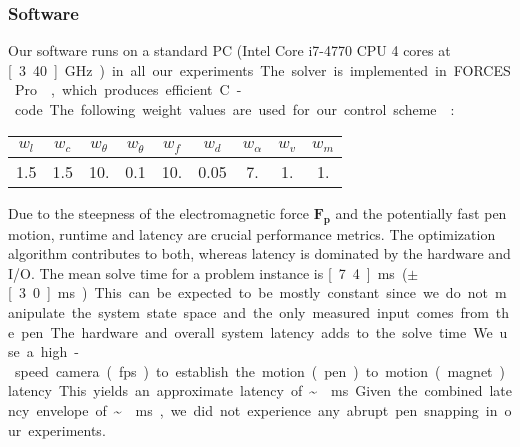 \subsubsection{Software}
Our software runs on a standard PC (Intel Core i7-4770 CPU 4 cores at \unit[3.40]{GHz}) in all our experiments. 
The solver is implemented in FORCES Pro \cite{forcespro}, which produces efficient C-code. 
The following weight values are used for our control scheme :

  \begin{tabular}{ccccccccc}
    \toprule
    $w_l$&$w_c$&$w_\theta$&$w_{\dot{\theta}}$&$w_f$&$w_d$&$w_\alpha$&$w_v$&$w_m$\\
    \midrule
    1.5&1.5&10.&0.1&10.&0.05&7.&1.&1.\\
   \bottomrule
   \end{tabular}
  \vspace{5pt}
  

Due to the steepness of the electromagnetic force $\mathbf{F_p}$ and the potentially fast pen motion, runtime and latency are crucial performance metrics. 
The optimization algorithm contributes to both, whereas latency is dominated by the hardware and I/O. 
The mean solve time for a problem instance is \unit[7.4]{ms} ($\pm$ \unit[3.0]{ms}). 
This can be expected to be mostly constant since we do not manipulate the system state space and the only measured input comes from the pen. 
The hardware and overall system latency adds to the solve time. 
We use a high-speed camera (\unit[1000]{fps}) to establish the motion (pen) to motion (magnet) latency. 
This yields an approximate latency of \textasciitilde{}\unit[10]{ms}. 
Given the combined latency envelope of \textasciitilde{}\unit[20]{ms}, we did not experience any abrupt pen snapping in our experiments.

